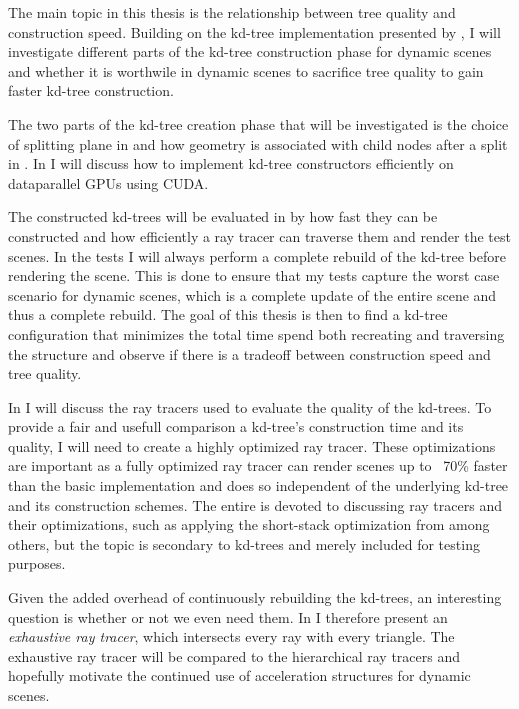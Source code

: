 The main topic in this thesis is the relationship between tree quality and
construction speed. Building on the kd-tree implementation presented by \zhou{},
I will investigate different parts of the kd-tree construction phase for dynamic
scenes and whether it is worthwile in dynamic scenes to sacrifice tree quality
to gain faster kd-tree construction.

The two parts of the kd-tree creation phase that will be investigated is the
choice of splitting plane in  and how geometry is
associated with child nodes after a split in
. In  I will discuss
how to implement kd-tree constructors efficiently on dataparallel GPUs using
CUDA.

The constructed kd-trees will be evaluated in  by how
fast they can be constructed and how efficiently a ray tracer can traverse them
and render the test scenes. In the tests I will always perform a complete
rebuild of the kd-tree before rendering the scene. This is done to ensure that
my tests capture the worst case scenario for dynamic scenes, which is a complete
update of the entire scene and thus a complete rebuild. The goal of this thesis
is then to find a kd-tree configuration that minimizes the total time spend both
recreating and traversing the structure and observe if there is a tradeoff
between construction speed and tree quality.

In  I will discuss the ray tracers used to evaluate
the quality of the kd-trees. To provide a fair and usefull comparison a
kd-tree's construction time and its quality, I will need to create a highly
optimized ray tracer. These optimizations are important as a fully optimized ray
tracer can render scenes up to ~70\% faster than the basic implementation and
does so independent of the underlying kd-tree and its construction schemes. The
entire  is devoted to discussing ray tracers and
their optimizations, such as applying the short-stack optimization from \horn{}
among others, but the topic is secondary to kd-trees and merely included for
testing purposes.

Given the added overhead of continuously rebuilding the kd-trees, an interesting
question is whether or not we even need them. In  I
therefore present an \textit{exhaustive ray tracer}, which intersects every ray
with every triangle. The exhaustive ray tracer will be compared to the
hierarchical ray tracers and hopefully motivate the continued use of
acceleration structures for dynamic scenes.

